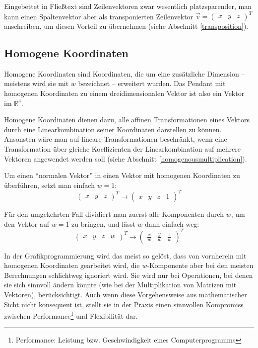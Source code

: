 Eingebettet in Fließtext sind Zeilenvektoren zwar wesentlich platzsparender, man kann einen Spaltenvektor aber als transponierten Zeilenvektor $\vec{v} = \begin{pmatrix} x & y & z \end{pmatrix}^T$ anschreiben, um diesen Vorteil zu übernehmen (siehe Abschnitt \ref{transposition}).


\subsection{Homogene Koordinaten}
Homogene Koordinaten sind Koordinaten, die um eine zusätzliche Dimension -- meistens wird sie mit $w$ bezeichnet -- erweitert wurden. Das Pendant mit homogenen Koordinaten zu einem dreidimensionalen Vektor ist also ein Vektor im $\mathbb{R}^4$.

Homogene Koordinaten dienen dazu, alle affinen Transformationen eines Vektors durch eine Linearkombination seiner Koordinaten darstellen zu können. Ansonsten wäre man auf lineare Transformationen beschränkt, wenn eine Transformation über gleiche Koeffizienten der Linearkombination auf mehrere Vektoren angewendet werden soll (siehe Abschnitt \ref{homogenousmultiplication}).

Um einen \enquote{normalen Vektor} in einen Vektor mit homogenen Koordinaten zu überführen, setzt man einfach $w = 1$:
\begin{equation}
 \begin{pmatrix} x & y & z \end{pmatrix}^T \rightarrow \begin{pmatrix} x & y & z & 1 \end{pmatrix}^T
\end{equation}

Für den umgekehrten Fall dividiert man zuerst alle Komponenten durch $w$, um den Vektor auf $w = 1$ zu bringen, und lässt $w$ dann einfach weg:
\begin{equation}
 \begin{pmatrix} x & y & z & w \end{pmatrix}^T \rightarrow \begin{pmatrix} \frac{x}{w} & \frac{y}{w} & \frac{z}{w} \end{pmatrix}^T
\end{equation}

In der Grafikprogrammierung wird das meist so gelöst, dass von vornherein mit homogenen Koordinaten gearbeitet wird, die $w$-Komponente aber bei den meisten Berechnungen schlichtweg ignoriert wird. Sie wird nur bei Operationen, bei denen sie sich sinnvoll ändern könnte (wie bei der Multiplikation von Matrizen mit Vektoren), berücksichtigt. Auch wenn diese Vorgehensweise aus mathematischer Sicht nicht konsequent ist, stellt sie in der Praxis einen sinnvollen Kompromiss zwischen Performance\footnote{Performance: Leistung bzw. Geschwindigkeit eines Computerprogramms} und Flexibilität dar.

